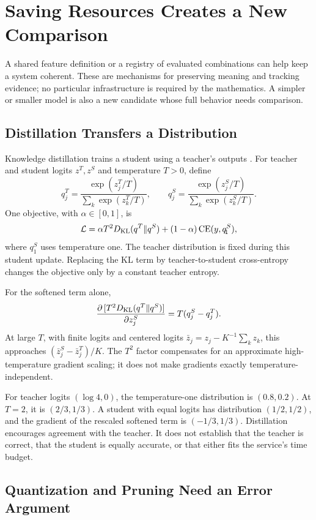 \section{Saving Resources Creates a New Comparison}
\label{sec:production-infra}

A shared feature definition or a registry of evaluated combinations can help keep a system coherent. These are mechanisms for preserving meaning and tracking evidence; no particular infrastructure is required by the mathematics. A simpler or smaller model is also a new candidate whose full behavior needs comparison.

\subsection{Distillation Transfers a Distribution}

Knowledge distillation trains a student using a teacher's outputs \citep{hinton2015distillation}. For teacher and student logits $z^T,z^S$ and temperature $T>0$, define
\[
q_j^T=\frac{\exp(z_j^T/T)}{\sum_k\exp(z_k^T/T)},
\qquad
q_j^S=\frac{\exp(z_j^S/T)}{\sum_k\exp(z_k^S/T)}.
\]
One objective, with $\alpha\in[0,1]$, is
\[
\mathcal L=
\alpha T^2D_{\rm KL}(q^T\|q^S)
+(1-\alpha)\operatorname{CE}(y,q^S_{\!1}),
\]
where $q^S_{\!1}$ uses temperature one. The teacher distribution is fixed during this student update. Replacing the KL term by teacher-to-student cross-entropy changes the objective only by a constant teacher entropy.

For the softened term alone,
\[
\frac{\partial\,[T^2D_{\rm KL}(q^T\|q^S)]}{\partial z_j^S}
=T(q_j^S-q_j^T).
\]
At large $T$, with finite logits and centered logits $\bar z_j=z_j-K^{-1}\sum_k z_k$, this approaches $(\bar z_j^S-\bar z_j^T)/K$. The $T^2$ factor compensates for an approximate high-temperature gradient scaling; it does not make gradients exactly temperature-independent.

For teacher logits $(\log4,0)$, the temperature-one distribution is $(0.8,0.2)$. At $T=2$, it is $(2/3,1/3)$. A student with equal logits has distribution $(1/2,1/2)$, and the gradient of the rescaled softened term is $(-1/3,1/3)$. Distillation encourages agreement with the teacher. It does not establish that the teacher is correct, that the student is equally accurate, or that either fits the service's time budget.

\subsection{Quantization and Pruning Need an Error Argument}


